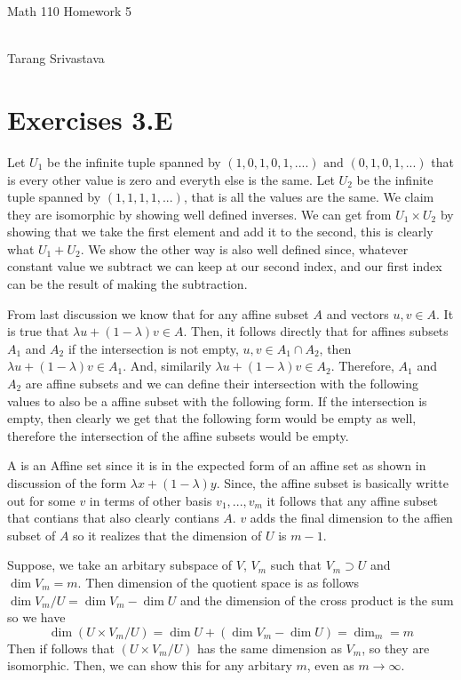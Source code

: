 \documentclass[10pt, twocolumn]{article}
\author{Tarang Srivastava}
\newcommand{\makechaptertitle}[1]{
\begin{center}
	\begin{large}
		#1
	\end{large}
	\begin{small}
		\\Tarang Srivastava
	\end{small}
\end{center}
}
\begin{document}
	
\makechaptertitle{Math 110 Homework 5}

\section{Exercises 3.E}
\begin{q}[3]
    Let $ U_1 $ be the infinite tuple spanned by $ (1, 0, 1, 0, 1 , ....) \text{ and } (0, 1, 0, 1, ...)  $ that is every other value is zero and everyth else is the same. 
    Let $ U_2 $ be the infinite tuple spanned by $ (1, 1, 1, 1, ...) $, that is all the values are the same. 
    We claim they are isomorphic by showing well defined inverses. 
    We can get from $ U_1 \times U_2 $ by showing that we take the first element and add it to the second, this is clearly what $ U_1 + U_2 $. 
    We show the other way is also well defined since,  whatever constant value we subtract we can keep at our second index, and our first index can be the result of making the subtraction. 
\end{q}
\begin{q}[10]
    From last discussion we know that for any affine subset $ A $ and vectors $ u, v \in A $. 
    It is true that $ \lambda u + (1 - \lambda) v \in A $. 
    Then, it follows directly that for affines subsets $ A_1 $ and $ A_2 $ if the intersection is not empty, 
    $ u, v \in A_1 \cap A_2 $, then $ \lambda u + (1 - \lambda) v \in A_1 $. 
    And, similarily $ \lambda u + (1 - \lambda) v \in A_2 $.  
    Therefore, $ A_1 $ and $ A_2 $ are affine subsets and we can define their intersection with the following values to also be a affine subset with the following form. 
    If the intersection is empty, then clearly we get that the following form would be empty as well, therefore the intersection of the affine subsets would be empty.
\end{q}
\begin{q}[11]
    A is an Affine set since it is in the expected form of an affine set as shown in discussion of the form $ \lambda x + (1-\lambda)  y $. 
    Since, the affine subset is basically writte out for some $ v $ in terms of other basis $ v_1, ..., v_m $ it follows that any affine subset that contians that also clearly contians $ A $. 
    $ v $ adds the final dimension to the affien subset of $ A $ so it realizes that the dimension of $ U $ is $ m - 1$. 
\end{q}
\begin{q}[12]
    Suppose, we take an arbitary subspace of $ V $,  $ V_m $ such that $ V_m \supset U $ and $ \dim V_m = m$. 
    Then dimension of the quotient space is as follows
    $ \dim V_m / U = \dim V_m - \dim U $
    and the dimension of the cross product is the sum so we have 
    $$ \dim (U \times V_m / U) = \dim U + (\dim V_m - \dim U) = \dim _m = m $$
    Then if follows that $(U \times V_m / U)$ has the same dimension as $ V_m $, so they are isomorphic.
    Then, we can show this for any arbitary $ m $, even as $ m \to \infty $.
\end{q}
\end{document}
